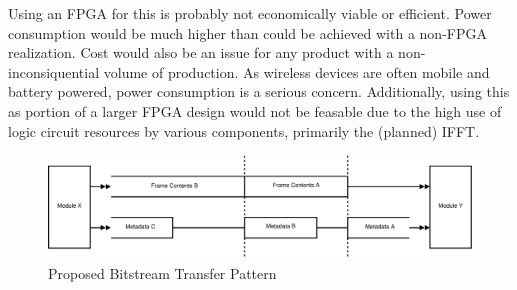 Using an FPGA for this is probably not economically viable or efficient. Power consumption would be much higher than could be achieved with a non-FPGA realization. Cost would also be an issue for any product with a non-inconsiquential volume of production. As wireless devices are often  mobile and battery powered, power consumption is a serious concern. Additionally, using this as portion of a larger FPGA design would not be feasable due to the high use of logic circuit resources by various components, primarily the (planned) IFFT.


\begin{figure}
\includegraphics[width=\linewidth]{conclution_metadata_transfer}
\caption{Proposed Bitstream Transfer Pattern	}
\label{fig:alt-bitstream}
\end{figure}
